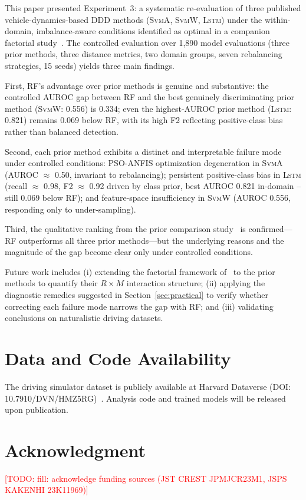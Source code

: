 \documentclass[lettersize,journal]{IEEEtran}
\newcommand{\todo}[1]{\textcolor{red}{[TODO: #1]}}
\newcommand{\Impl}[1]{\textsc{#1}}
\begin{document}
This paper presented Experiment~3: a systematic re-evaluation of three published vehicle-dynamics-based DDD methods (\Impl{SvmA}, \Impl{SvmW}, \Impl{Lstm}) under the within-domain, imbalance-aware conditions identified as optimal in a companion factorial study~\cite{nakagama2026tiv}.
The controlled evaluation over 1{,}890 model evaluations (three prior methods, three distance metrics, two domain groups, seven rebalancing strategies, 15 seeds) yields three main findings.

First, RF's advantage over prior methods is genuine and substantive: the controlled AUROC gap between RF and the best genuinely discriminating prior method (\Impl{SvmW}: 0.556) is 0.334; even the highest-AUROC prior method (\Impl{Lstm}: 0.821) remains 0.069 below RF, with its high F2 reflecting positive-class bias rather than balanced detection.

Second, each prior method exhibits a distinct and interpretable failure mode under controlled conditions: PSO-ANFIS optimization degeneration in \Impl{SvmA} (AUROC $\approx$ 0.50, invariant to rebalancing); persistent positive-class bias in \Impl{Lstm} (recall $\approx$ 0.98, F2 $\approx$ 0.92 driven by class prior, best AUROC 0.821 in-domain -- still 0.069 below RF); and feature-space insufficiency in \Impl{SvmW} (AUROC 0.556, responding only to under-sampling).

Third, the qualitative ranking from the prior comparison study~\cite{nakagama2025iv} is confirmed---RF outperforms all three prior methods---but the underlying reasons and the magnitude of the gap become clear only under controlled conditions.

Future work includes (i) extending the factorial framework of~\cite{nakagama2026tiv} to the prior methods to quantify their $R \times M$ interaction structure; (ii) applying the diagnostic remedies suggested in Section~\ref{sec:practical} to verify whether correcting each failure mode narrows the gap with RF; and (iii) validating conclusions on naturalistic driving datasets.

\section*{Data and Code Availability}
The driving simulator dataset is publicly available at Harvard Dataverse (DOI: 10.7910/DVN/HMZ5RG)~\cite{aygun2024}.
Analysis code and trained models will be released upon publication.

\section*{Acknowledgment}
\todo{fill: acknowledge funding sources (JST CREST JPMJCR23M1, JSPS KAKENHI 23K11969)}
\end{document}
